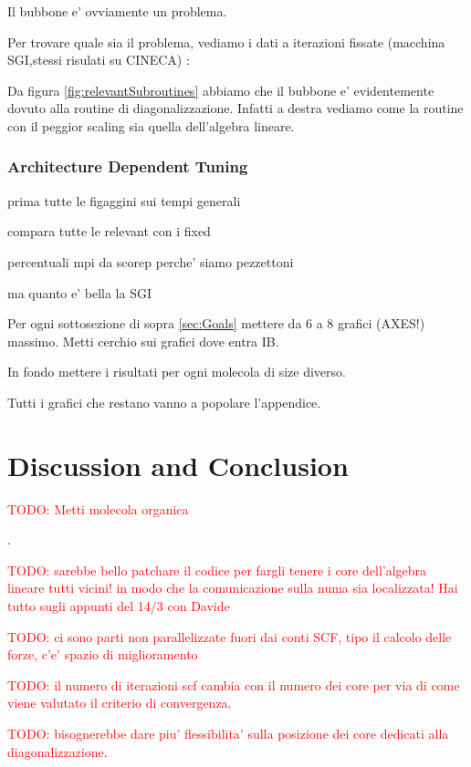 \documentclass[a4paper,12pt]{article}
\newcommand\mynotes[1]{\begin{flushright}

\textcolor{red}{TODO: #1}\end{flushright}}
\begin{document}
Il bubbone e' ovviamente un problema. 

Per trovare quale sia il problema, vediamo i dati a iterazioni fissate (macchina SGI,stessi risulati su CINECA) :

Da figura \ref{fig:relevantSubroutines} abbiamo che il bubbone e' evidentemente dovuto alla routine di diagonalizzazione.
Infatti a destra vediamo come la routine con il peggior scaling sia quella dell'algebra lineare.








\newpage
\subsubsection{Architecture Dependent Tuning}
prima tutte le figaggini sui tempi generali

compara tutte le relevant con i fixed

percentuali mpi da scorep perche' siamo pezzettoni

ma quanto e' bella la SGI




Per ogni sottosezione di sopra \ref{sec:Goals} mettere da 6 a 8 grafici (AXES!) massimo.
Metti cerchio sui grafici dove entra IB.


In fondo mettere i risultati per ogni molecola di size diverso.
	
Tutti i grafici che restano vanno a popolare l'appendice.

\section{Discussion and Conclusion}

\mynotes{Metti molecola organica}.

\mynotes{sarebbe bello patchare il codice per fargli tenere i core dell'algebra lineare tutti vicini! in modo che la comunicazione sulla numa sia localizzata! Hai tutto sugli appunti del 14/3 con Davide}

\mynotes{ci sono parti non parallelizzate fuori dai conti SCF, tipo il calcolo delle forze, c'e' spazio di miglioramento}
\mynotes{il numero di iterazioni scf cambia con il numero dei core per via di come viene valutato il criterio di convergenza.}
\mynotes{bisognerebbe dare piu' flessibilita' sulla posizione dei core dedicati alla diagonalizzazione.}

\newpage
\end{document}

